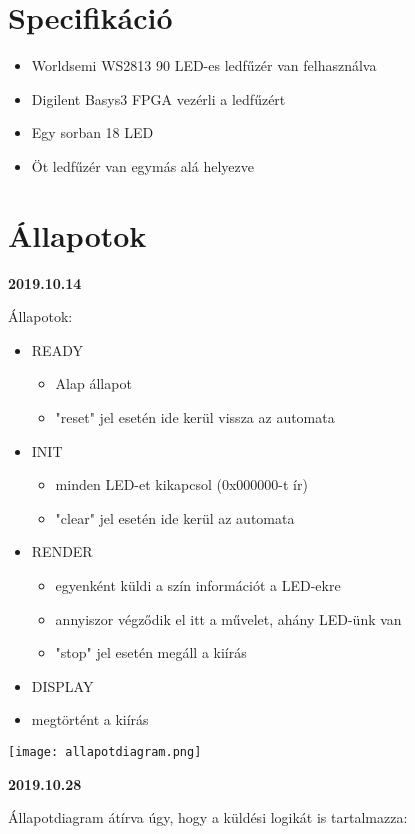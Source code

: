 \documentclass[10pt]{article} %
\begin{document}
\section{Specifikáció}

\begin{itemize}
\item Worldsemi WS2813 90 LED-es ledfűzér van felhasználva
\item Digilent Basys3 FPGA vezérli a ledfűzért 
\item Egy sorban 18 LED
\item Öt ledfűzér van egymás alá helyezve
\end{itemize}

\section{Állapotok}

\textbf{2019.10.14}

Állapotok:
\begin{itemize}
\item READY
	\begin{itemize}
	\item Alap állapot 
	\item "reset" jel esetén ide kerül vissza az automata
	\end{itemize}
\item INIT
	\begin{itemize}
	\item minden LED-et kikapcsol (0x000000-t ír)
	\item "clear" jel esetén ide kerül az automata
	\end{itemize}
\item RENDER
	\begin{itemize}
	\item egyenként küldi a szín információt a LED-ekre
	\item annyiszor végződik el itt a művelet, ahány LED-ünk van
	\item "stop" jel esetén megáll a kiírás
	\end{itemize}
\item DISPLAY
	\item megtörtént a kiírás
\end{itemize}

\texttt{[image: allapotdiagram.png]}

\textbf{2019.10.28}

Állapotdiagram átírva úgy, hogy a küldési logikát is tartalmazza:
\end{document}
